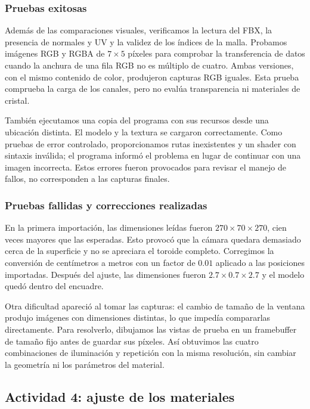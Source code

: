 \subsubsection{Pruebas exitosas}

Además de las comparaciones visuales, verificamos la lectura del FBX, la presencia de normales y UV y la validez de los índices de la malla. Probamos imágenes RGB y RGBA de $7\times5$ píxeles para comprobar la transferencia de datos cuando la anchura de una fila RGB no es múltiplo de cuatro. Ambas versiones, con el mismo contenido de color, produjeron capturas RGB iguales. Esta prueba comprueba la carga de los canales, pero no evalúa transparencia ni materiales de cristal.

También ejecutamos una copia del programa con sus recursos desde una ubicación distinta. El modelo y la textura se cargaron correctamente. Como pruebas de error controlado, proporcionamos rutas inexistentes y un shader con sintaxis inválida; el programa informó el problema en lugar de continuar con una imagen incorrecta. Estos errores fueron provocados para revisar el manejo de fallos, no corresponden a las capturas finales.

\subsubsection{Pruebas fallidas y correcciones realizadas}

En la primera importación, las dimensiones leídas fueron $270\times70\times270$, cien veces mayores que las esperadas. Esto provocó que la cámara quedara demasiado cerca de la superficie y no se apreciara el toroide completo. Corregimos la conversión de centímetros a metros con un factor de $0.01$ aplicado a las posiciones importadas. Después del ajuste, las dimensiones fueron $2.7\times0.7\times2.7$ y el modelo quedó dentro del encuadre.

Otra dificultad apareció al tomar las capturas: el cambio de tamaño de la ventana produjo imágenes con dimensiones distintas, lo que impedía compararlas directamente. Para resolverlo, dibujamos las vistas de prueba en un framebuffer de tamaño fijo antes de guardar sus píxeles. Así obtuvimos las cuatro combinaciones de iluminación y repetición con la misma resolución, sin cambiar la geometría ni los parámetros del material.

\subsection{Actividad 4: ajuste de los materiales}
\label{sec:act4_experimentos}

